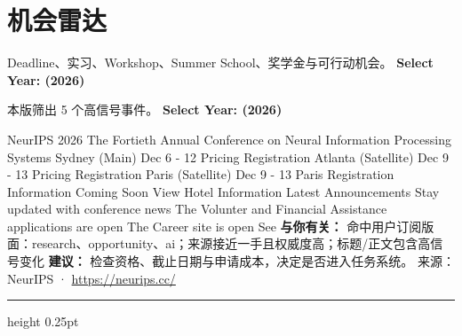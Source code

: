 \documentclass[10.5pt]{ctexart}
\begin{document}
\section*{机会雷达}
{\color{ormuted} Deadline、实习、Workshop、Summer School、奖学金与可行动机会。}
\vspace{2mm}
{\LARGE\bfseries Select Year: (2026)}\par
\vspace{1mm}
{\color{ormuted} 本版筛出 5 个高信号事件。}
\vspace{3mm}
{\Large\bfseries Select Year: (2026)}\par
NeurIPS 2026 The Fortieth Annual Conference on Neural Information Processing Systems Sydney (Main) Dec 6 - 12 Pricing Registration Atlanta (Satellite) Dec 9 - 13 Pricing Registration Paris (Satellite) Dec 9 - 13 Paris Registration Information Coming Soon View Hotel Information Latest Announcements Stay updated with conference news The Volunter and Financial Assistance applications are open The Career site is open See
\textbf{与你有关：} 命中用户订阅版面：research、opportunity、ai；来源接近一手且权威度高；标题/正文包含高信号变化
\textbf{建议：} 检查资格、截止日期与申请成本，决定是否进入任务系统。
{\footnotesize\color{ormuted} 来源：NeurIPS · \url{https://neurips.cc/}}
\vspace{4mm}
\hrule height 0.25pt
\vspace{3mm}
\end{document}
